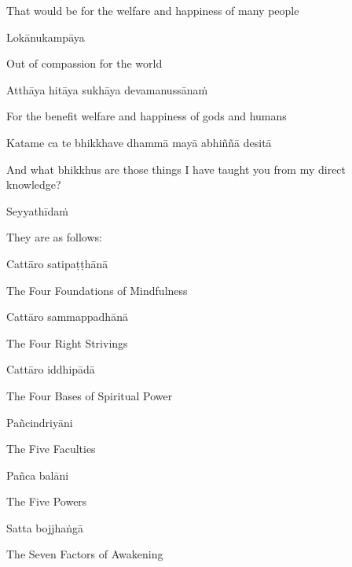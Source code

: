 \begin{cprenglish}
  That would be for the welfare and happiness of many people
\end{cprenglish}

Lokānukampāya

\begin{cprenglish}
  Out of compassion for the world
\end{cprenglish}

Atthāya hitāya sukhāya devamanussānaṁ

\begin{cprenglish}
  For the benefit welfare and happiness of gods and humans
\end{cprenglish}

Katame ca te bhikkhave dhammā mayā abhiññā desitā

\begin{cprenglish}
  And what bhikkhus are those things I have taught you from my direct knowledge?
\end{cprenglish}

Seyyathīdaṁ

\begin{cprenglish}
  They are as follows:
\end{cprenglish}

Cattāro satipaṭṭhānā

\begin{cprenglish}
  The Four Foundations of Mindfulness
\end{cprenglish}

Cattāro sammappadhānā

\begin{cprenglish}
  The Four Right Strivings
\end{cprenglish}

Cattāro iddhipādā

\begin{cprenglish}
  The Four Bases of Spiritual Power
\end{cprenglish}

Pañcindriyāni

\begin{cprenglish}
  The Five Faculties
\end{cprenglish}

Pañca balāni

\begin{cprenglish}
  The Five Powers
\end{cprenglish}

Satta bojjhaṅgā

\begin{cprenglish}
  The Seven Factors of Awakening
\end{cprenglish}

